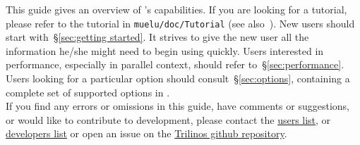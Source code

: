 This guide gives an overview of \muelu{}'s capabilities.  If you are looking for
a tutorial, please refer to the \muelu{} tutorial in \verb!muelu/doc/Tutorial!
(see also~\cite{MueLuTutorial}). New users should start with~\S\ref{sec:getting
started}. It strives to give the new user all the information he/she might need
to begin using \muelu{} quickly. Users interested in performance, especially in
parallel context, should refer to~\S\ref{sec:performance}.  Users looking for a
particular option should consult~\S\ref{sec:options}, containing a complete set of
supported options in \muelu{}. \\

\noindent
If you find any errors or omissions in this guide, have comments or suggestions,
or would like to contribute to \muelu{} development, please contact the \muelu{}
\href{mailto:muelu-users@software.sandia.gov}{users list}, or
\href{mailto:muelu-developers@software.sandia.gov}{developers list} or open an
issue on the \href{https://github.com/trilinos/Trilinos}{Trilinos github repository}.


